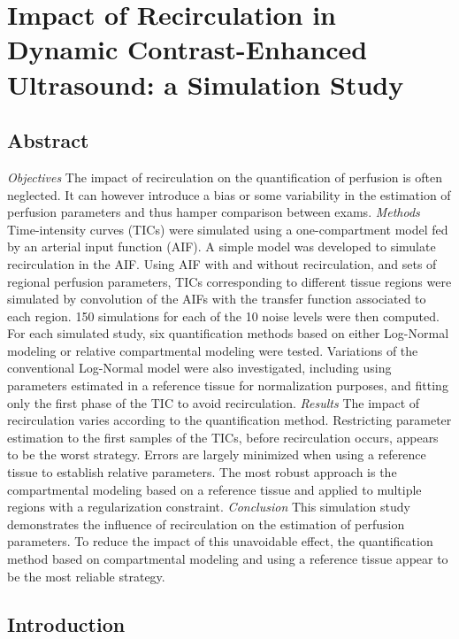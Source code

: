 \chapter{Impact of Recirculation in Dynamic Contrast-Enhanced Ultrasound: a Simulation Study}\label{chapter:IRBM}

\section{Abstract}
\textit{Objectives} The impact of recirculation on the quantification of perfusion is often neglected. It can however introduce a bias or some variability in the estimation of perfusion parameters and thus hamper comparison between exams.
\textit{Methods} Time-intensity curves (TICs) were simulated using a one-compartment model fed by an arterial input function (AIF). A simple model was developed to simulate recirculation in the AIF. Using AIF with and without recirculation, and sets of regional perfusion parameters, TICs corresponding to different tissue regions were simulated by convolution of the AIFs with the transfer function associated to each region. 150 simulations for each of the 10 noise levels were then computed. For each simulated study, six quantification methods based on either Log-Normal modeling or relative compartmental modeling were tested. Variations of the conventional Log-Normal model were also investigated, including using parameters estimated in a reference tissue for normalization purposes, and fitting only the first phase of the TIC to avoid recirculation. \textit{Results} The impact of recirculation varies according to the quantification method. Restricting parameter estimation to the first samples of the TICs, before recirculation occurs, appears to be the worst strategy. Errors are largely minimized when using a reference tissue to establish relative parameters. The most robust approach is the compartmental modeling based on a reference tissue and applied to multiple regions with a regularization constraint. 
\textit{Conclusion} This simulation study demonstrates the influence of recirculation on the estimation of perfusion parameters. To reduce the impact of this unavoidable effect, the quantification method based on compartmental modeling and using a reference tissue appear to be the most reliable strategy.


\section{Introduction}
\label{sec:intro}

